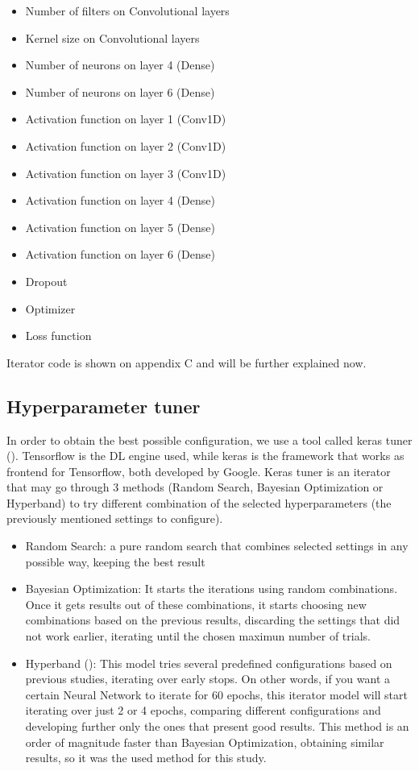 \documentclass[openany]{article}
\begin{document}
\begin{itemize}
	\item Number of filters on Convolutional layers 
	\item Kernel size on Convolutional layers
	\item Number of neurons on layer 4 (Dense)
	\item Number of neurons on layer 6 (Dense)
	\item Activation function on layer 1 (Conv1D)
	\item Activation function on layer 2 (Conv1D)
	\item Activation function on layer 3 (Conv1D)
	\item Activation function on layer 4 (Dense)
	\item Activation function on layer 5 (Dense)
	\item Activation function on layer 6 (Dense)
	\item Dropout
	\item Optimizer
	\item Loss function

\end{itemize}

Iterator code is shown on appendix C and will be further explained now.

\subsection{Hyperparameter tuner}

In order to obtain the best possible configuration, we use a tool called keras tuner (\cite{omalley2019kerastuner}). Tensorflow is the DL engine used, while keras is the framework that works as frontend for Tensorflow, both developed by Google. Keras tuner is an iterator that may go through 3 methods (Random Search, Bayesian Optimization or Hyperband) to try different combination of the selected hyperparameters (the previously mentioned settings to configure).

\begin{itemize}
    \item Random Search: a pure random search that combines selected settings in any possible way, keeping the best result
    \item Bayesian Optimization: It starts the iterations using random combinations. Once it gets results out of these combinations, it starts choosing new combinations based on the previous results, discarding the settings that did not work earlier, iterating until the chosen maximun number of trials. 
    \item Hyperband (\cite{JMLR:v18:16-558}): This model tries several predefined configurations based on previous studies, iterating over early stops. On other words, if you want a certain Neural Network to iterate for 60 epochs, this iterator model will start iterating over just 2 or 4 epochs, comparing different configurations and developing further only the ones that present good results. This method is an order of magnitude faster than Bayesian Optimization, obtaining similar results, so it was the used method for this study.
\end{itemize}
\end{document}
